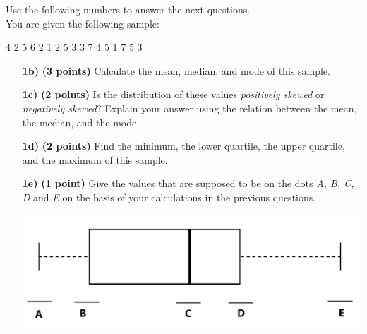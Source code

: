 Use the following numbers to answer the next questions. \\

You are given the following sample: \\
\begin{center}
    4 \hspace{.1cm} 2 \hspace{.1cm} 5 \hspace{.1cm} 6 \hspace{.1cm} 2 \hspace{.1cm} 1 \hspace{.1cm} 2 \hspace{.1cm} 5 \hspace{.1cm} 3 \hspace{.1cm} 3 \hspace{.1cm} 7 \hspace{.1cm} 4 \hspace{.1cm} 5 \hspace{.1cm} 1 \hspace{.1cm} 7 \hspace{.1cm} 5 \hspace{.1cm} 3
\end{center}

\begin{itemize}

\item[\textbf{1b)}] \textbf{(3 points)} Calculate the mean, median, and mode of this sample.

\item[\textbf{1c)}] \textbf{(2 points)} Is the distribution of these values \textit{positively skewed} or \textit{negatively skewed}? Explain your answer using the relation between the mean, the median, and the mode.

\item[\textbf{1d)}] \textbf{(2 points)} Find the minimum, the lower quartile, the upper quartile, and the maximum of this sample. 

\item[\textbf{1e)}] \textbf{(1 point)} Give the values that are supposed to be on the dots \textit{A, B, C, D} and \textit{E} on the basis of your calculations in the previous questions. \\
\begin{center}
    \includegraphics[width=.7\textwidth]{Files/Images/boxPlotExam.png}
\end{center}

\end{itemize}

